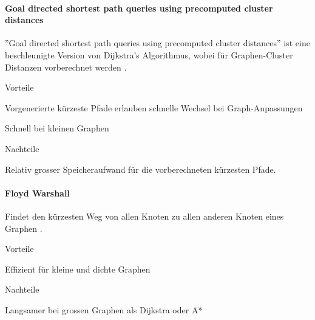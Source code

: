 \documentclass[../main.tex]{subfiles}
\begin{document}
\paragraph{Goal directed shortest path queries using precomputed cluster distances}

''Goal directed shortest path queries using precomputed cluster distances'' ist eine beschleunigte Version von Dijkstra's Algorithmus, wobei für Graphen-Cluster Distanzen vorberechnet werden \cite{goal_directed_queries}.

\begin{minipage}[t]{0.48\textwidth}
\begin{items}
  \item [Vorteile]
  \item Vorgenerierte kürzeste Pfade erlauben schnelle Wechsel bei Graph-Anpassungen
  \item Schnell bei kleinen Graphen
\end{items}
\end{minipage}
\hfill
\begin{minipage}[t]{0.48\textwidth}
\begin{items}
  \item [Nachteile]
  \item Relativ grosser Speicheraufwand für die vorberechneten kürzesten Pfade.
\end{items}
\end{minipage}

\paragraph{Floyd Warshall}
Findet den kürzesten Weg von allen Knoten zu allen anderen Knoten eines Graphen \cite{floyd_warshall}.

\begin{minipage}[t]{0.48\textwidth}
\begin{items}
  \item [Vorteile]
  \item Effizient für kleine und dichte Graphen
\end{items}
\end{minipage}
\hfill
\begin{minipage}[t]{0.48\textwidth}
\begin{items}
  \item [Nachteile]
  \item Langsamer bei grossen Graphen als Dijkstra oder A* 
\end{items}
\end{minipage}
\end{document}
